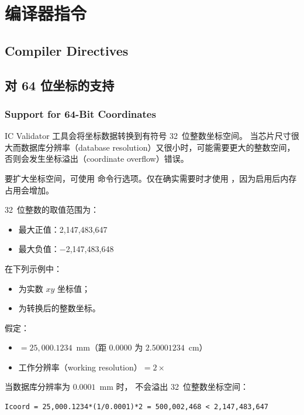 
\section{编译器指令}
\subsection*{Compiler Directives}

\subsection{对 64 位坐标的支持}
\subsubsection*{Support for 64-Bit Coordinates}

IC Validator 工具会将坐标数据转换到有符号 32~位整数坐标空间。
当芯片尺寸很大而数据库分辨率（database resolution）又很小时，可能需要更大的整数空间，否则会发生坐标溢出（coordinate overflow）错误。

要扩大坐标空间，可使用  命令行选项。仅在确实需要时才使用 ，因为启用后内存占用会增加。

32~位整数的取值范围为：
\begin{itemize}
  \item 最大正值：2{,}147{,}483{,}647
  \item 最大负值：$-$2{,}147{,}483{,}648
\end{itemize}

在下列示例中：
\begin{itemize}
  \item {} 为实数 $xy$ 坐标值；
  \item {} 为转换后的整数坐标。
\end{itemize}

假定：
\begin{itemize}
  \item {} $= 25{,}000.1234$~mm（距 $0.0000$ 为 $2.50001234$~cm）
  \item 工作分辨率（working resolution）$= 2\times$
\end{itemize}

当数据库分辨率为 $0.0001$~mm 时， 不会溢出 32~位整数坐标空间：
\begin{lstlisting}
Icoord = 25,000.1234*(1/0.0001)*2 = 500,002,468 < 2,147,483,647
\end{lstlisting}

